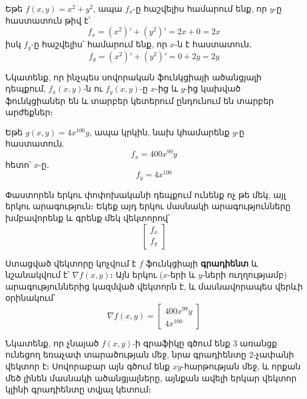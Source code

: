 \begin{example}
Եթե $f(x, y) = x^2 + y^2$, ապա $f_x$-ը հաշվելիս համարում ենք, որ $y$-ը հաստատուն թիվ է՝
\[
f_x= (x^2)' + (y^2)' = 2x + 0 = 2x
\]
իսկ $f_y$-ը հաշվելիս՝ համարում ենք, որ $x$-ն է հաստատուն․
\[
f_y = (x^2)' + (y^2)' = 0 + 2y = 2y
\]
\end{example}

Նկատենք, որ ինչպես սովորական ֆունկցիայի ածանցյալի դեպքում, $f_x(x,y)$-ն ու $f_y(x,y)$-ը $x$-ից և $y$-ից կախված ֆունկցիաներ են և տարբեր կետերում ընդունում են տարբեր արժեքներ։

\begin{example}
Եթե $g(x, y) = 4x^{100}y$, ապա կրկին, նախ կհամարենք $y$-ը հաստատուն.
\[
f_x = 400x^{99}y
\]
հետո՝ $x$-ը․
\[
f_y = 4x^{100}
\]
\end{example}

Փաստորեն երկու փոփոխականի դեպքում ունենք ոչ թե մեկ, այլ երկու արագություն։ Եկեք այդ երկու մասնակի արագությունները խմբավորենք և գրենք մեկ վեկտորով՝
\[
\begin{bmatrix}
f_x \\ f_y
\end{bmatrix}
\]

Ստացված վեկտորը կոչվում է $f$ ֆունկցիայի \textbf{գրադիենտ} և նշանակվում է՝ $\nabla f(x,y)$։ Այն երկու ($x$-երի և $y$-ների ուղղությամբ) արագություններից կազմված վեկտորն է, և մասնավորապես վերևի օրինակում՝
\[
\nabla f(x, y) = \begin{bmatrix}
    400x^{99}y \\ 4x^{100}
\end{bmatrix}
\]


Նկատենք, որ չնայած $f(x,y)$-ի գրաֆիկը գծում ենք $3$ առանցք ունեցող եռաչափ տարածության մեջ, նրա գրադիենտը $2$-չափանի վեկտոր է։ Սովորաբար այն գծում ենք $xy$-հարթության մեջ, և որքան մեծ լինեն մասնակի ածանցյալները, այնքան ավելի երկար վեկտոր կլինի գրադիենտը տվյալ կետում։ 

